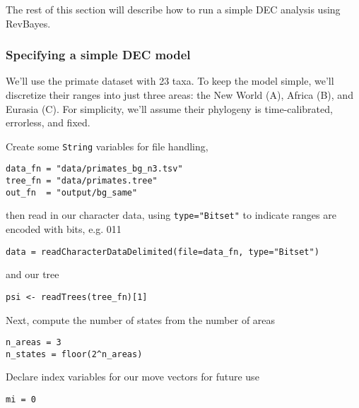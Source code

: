 The rest of this section will describe how to run a simple DEC analysis using RevBayes.

\newpage


\subsubsection{Specifying a simple DEC model}

We'll use the primate dataset with 23 taxa. To keep the model simple, we'll discretize their ranges into just three areas: the New World (A), Africa (B), and Eurasia (C).
For simplicity, we'll assume their phylogeny is time-calibrated, errorless, and fixed.

Create some {\tt String} variables for file handling,
{\tt \small \begin{snugshade}
\begin{lstlisting}
data_fn = "data/primates_bg_n3.tsv"
tree_fn = "data/primates.tree"
out_fn  = "output/bg_same"
\end{lstlisting}
\end{snugshade} }

then read in our character data, using {\tt type="Bitset"} to indicate ranges are encoded with bits, e.g. 011

\begin{snugshade}
\begin{lstlisting}
data = readCharacterDataDelimited(file=data_fn, type="Bitset")
\end{lstlisting}
\end{snugshade}

and our tree

\begin{snugshade}
\begin{lstlisting}
psi <- readTrees(tree_fn)[1]
\end{lstlisting}
\end{snugshade}

Next, compute the number of states from the number of areas

\begin{snugshade}
\begin{lstlisting}
n_areas = 3
n_states = floor(2^n_areas)
\end{lstlisting}
\end{snugshade}

Declare index variables for our move vectors for future use

\begin{snugshade}
\begin{lstlisting}
mi = 0
\end{lstlisting}
\end{snugshade}

